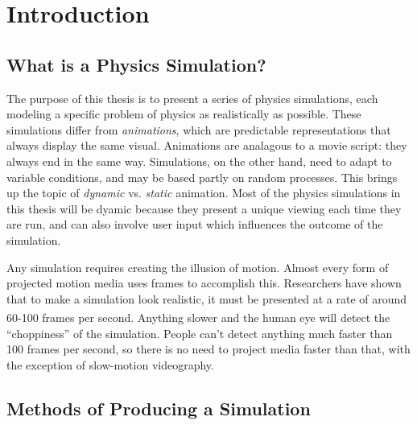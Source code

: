 
\chapter*{Introduction}
\label{intro} %



\section{What is a Physics Simulation?}

\hspace{.5cm} The purpose of this thesis is to present a series of physics simulations, each modeling a specific problem of physics as realistically as possible.  These simulations differ from \textit{animations}, which are predictable representations that always display the same visual.  Animations are analagous to a movie script: they always end in the same way.  Simulations, on the other hand, need to adapt to variable conditions, and may be based partly on random processes.  This brings up the topic of \textit{dynamic} vs. \textit{static} animation.  Most of the physics simulations in this thesis will be dyamic because they present a unique viewing each time they are run, and can also involve user input which influences the outcome of the simulation.

Any simulation requires creating the illusion of motion.  Almost every form of projected motion media uses frames to accomplish this.  Researchers have shown that to make a simulation look realistic, it must be presented at a rate of around 60-100 frames per second.\textsuperscript{\cite{jsbook}}  Anything slower and the human eye will detect the ``choppiness'' of the simulation.  People can't detect anything much faster than 100 frames per second, so there is no need to project media faster than that, with the exception of slow-motion videography.  






\section{Methods of Producing a Simulation}

